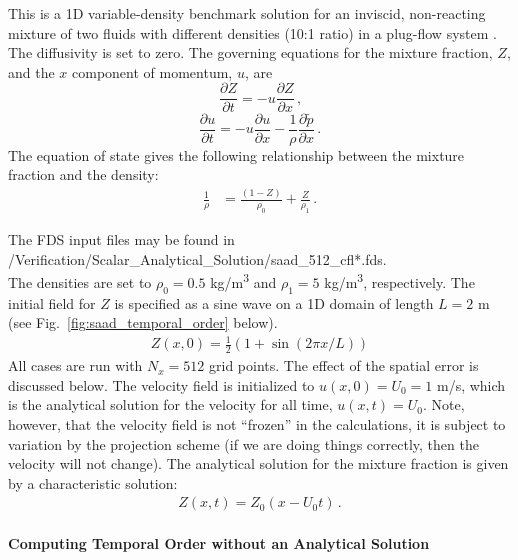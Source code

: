 \documentclass[11pt]{book}
\begin{document}
\noindent This is a 1D variable-density benchmark solution for an inviscid, non-reacting mixture of two fluids with different densities (10:1 ratio) in a plug-flow system \cite{Biglari:2013}.  The diffusivity is set to zero.  The governing equations for the mixture fraction, $Z$, and the $x$ component of momentum, $u$, are
\begin{equation}
\frac{\partial Z}{\partial t} = - u\frac{\partial Z}{\partial x} \,\mbox{,}
\end{equation}
\begin{equation}
\frac{\partial u}{\partial t} = - u\frac{\partial u}{\partial x} - \frac{1}{\rho} \frac{\partial \tilde{p}}{\partial x} \,\mbox{.}
\end{equation}
The equation of state gives the following relationship between the mixture fraction and the density:
\begin{align}
\frac{1}{\rho} &= \frac{(1-Z)}{\rho_0} + \frac{Z}{\rho_1} \,\mbox{.}
\end{align}

The FDS input files may be found in\\
{\ct /Verification/Scalar\_Analytical\_Solution/saad\_512\_cfl*.fds}.\\

\noindent The densities are set to $\rho_0 = 0.5$ \si{kg/m^3} and $\rho_1 = 5$ \si{kg/m^3}, respectively.  The initial field for $Z$ is specified as a sine wave on a 1D domain of length $L=2$ m (see Fig.~\ref{fig:saad_temporal_order} below).
\begin{align}
Z(x,0) = \frac{1}{2}\left( 1 + \sin(2\pi x/L) \right)
\end{align}
All cases are run with $N_x = 512$ grid points.  The effect of the spatial error is discussed below. The velocity field is initialized to $u(x,0) = U_0 = 1$ m/s, which is the analytical solution for the velocity for all time, $u(x,t) = U_0$.  Note, however, that the velocity field is not ``frozen'' in the calculations, it is subject to variation by the projection scheme (if we are doing things correctly, then the velocity will not change).  The analytical solution for the mixture fraction is given by a characteristic solution:
\begin{align}
Z(x,t) = Z_0(x-U_0 t) \,\mbox{.}
\end{align}

\paragraph{Computing Temporal Order without an Analytical Solution}
\end{document}
